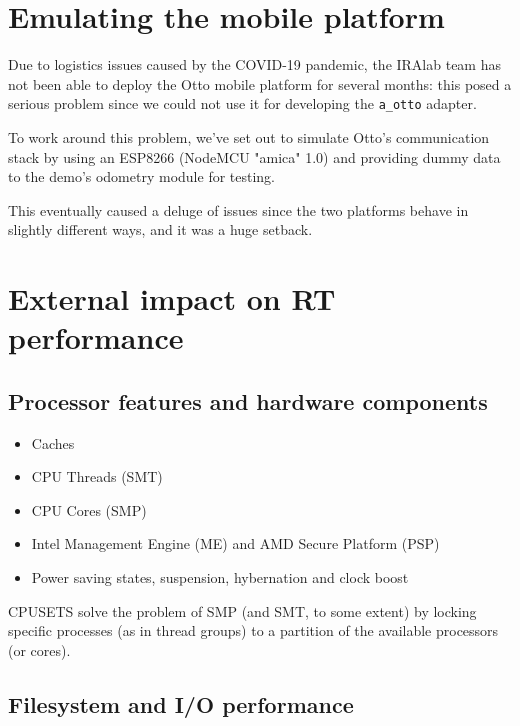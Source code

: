 \documentclass[a4paper,12pt]{report}
\begin{document}
\section{Emulating the mobile platform}

Due to logistics issues caused by the COVID-19 pandemic, the IRAlab team has not been able to deploy the Otto mobile platform for several months: this posed a serious problem since we could not use it for developing the \texttt{a\_otto} adapter.

To work around this problem, we've set out to simulate Otto's communication stack by using an ESP8266 (NodeMCU "amica" 1.0) and providing dummy data to the demo's odometry module for testing. 

This eventually caused a deluge of issues since the two platforms behave in slightly different ways, and it was a huge setback.

\section{External impact on RT performance}

\subsection{Processor features and hardware components}
\begin{itemize}
    \item Caches
    \item CPU Threads (SMT)
    \item CPU Cores (SMP)
    \item Intel Management Engine (ME) and AMD Secure Platform (PSP)
    \item Power saving states, suspension, hybernation and clock boost
\end{itemize}

CPUSETS solve the problem of SMP (and SMT, to some extent) by locking specific processes (as in thread groups) to a partition of the available processors (or cores).

\subsection{Filesystem and I/O performance}

\printbibliography
\end{document}
